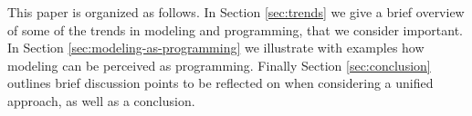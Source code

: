 This paper is organized as follows.
In Section \ref{sec:trends} we give a brief overview of some 
of the trends in modeling and programming, that we consider important. 
In Section \ref{sec:modeling-as-programming} we illustrate with examples how modeling can be perceived as programming. 
Finally Section \ref{sec:conclusion} outlines
brief discussion points to be reflected on
when considering a unified approach, as well
as a conclusion.

